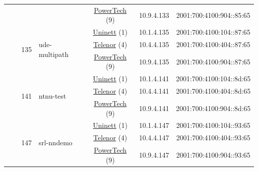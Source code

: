 \begin{small}
\begin{center}
\begin{longtable}{|c|c|c|c|c|c|c|c|}
  &  &  &  & \multicolumn{2}{|c|}{\tiny{\href{http://www.powertech.no}{PowerTech} (9)}} & \tiny{10.9.4.133} & \tiny{2001:700:4100:904::85:65} \\* \cline{3-3}\cline{4-4}\cline{5-5}\cline{6-6}\cline{7-7}\cline{8-8}
  &  & \multirow{3}{*}{\tiny{135}} & \multicolumn{1}{|l|}{\multirow{3}{*}{\tiny{ude-multipath}}} & \multicolumn{2}{|c|}{\tiny{\href{https://www.uninett.no}{Uninett} (1)}} & \tiny{10.1.4.135} & \tiny{2001:700:4100:104::87:65} \\* \cline{5-5}\cline{6-6}\cline{7-7}\cline{8-8}
  &  &  &  & \multicolumn{2}{|c|}{\tiny{\href{https://www.telenor.no}{Telenor} (4)}} & \tiny{10.4.4.135} & \tiny{2001:700:4100:404::87:65} \\* \cline{5-5}\cline{6-6}\cline{7-7}\cline{8-8}
  &  &  &  & \multicolumn{2}{|c|}{\tiny{\href{http://www.powertech.no}{PowerTech} (9)}} & \tiny{10.9.4.135} & \tiny{2001:700:4100:904::87:65} \\* \cline{3-3}\cline{4-4}\cline{5-5}\cline{6-6}\cline{7-7}\cline{8-8}
  &  & \multirow{3}{*}{\tiny{141}} & \multicolumn{1}{|l|}{\multirow{3}{*}{\tiny{ntnu-test}}} & \multicolumn{2}{|c|}{\tiny{\href{https://www.uninett.no}{Uninett} (1)}} & \tiny{10.1.4.141} & \tiny{2001:700:4100:104::8d:65} \\* \cline{5-5}\cline{6-6}\cline{7-7}\cline{8-8}
  &  &  &  & \multicolumn{2}{|c|}{\tiny{\href{https://www.telenor.no}{Telenor} (4)}} & \tiny{10.4.4.141} & \tiny{2001:700:4100:404::8d:65} \\* \cline{5-5}\cline{6-6}\cline{7-7}\cline{8-8}
  &  &  &  & \multicolumn{2}{|c|}{\tiny{\href{http://www.powertech.no}{PowerTech} (9)}} & \tiny{10.9.4.141} & \tiny{2001:700:4100:904::8d:65} \\* \cline{3-3}\cline{4-4}\cline{5-5}\cline{6-6}\cline{7-7}\cline{8-8}
  &  & \multirow{3}{*}{\tiny{147}} & \multicolumn{1}{|l|}{\multirow{3}{*}{\tiny{srl-nndemo}}} & \multicolumn{2}{|c|}{\tiny{\href{https://www.uninett.no}{Uninett} (1)}} & \tiny{10.1.4.147} & \tiny{2001:700:4100:104::93:65} \\* \cline{5-5}\cline{6-6}\cline{7-7}\cline{8-8}
  &  &  &  & \multicolumn{2}{|c|}{\tiny{\href{https://www.telenor.no}{Telenor} (4)}} & \tiny{10.4.4.147} & \tiny{2001:700:4100:404::93:65} \\* \cline{5-5}\cline{6-6}\cline{7-7}\cline{8-8}
  &  &  &  & \multicolumn{2}{|c|}{\tiny{\href{http://www.powertech.no}{PowerTech} (9)}} & \tiny{10.9.4.147} & \tiny{2001:700:4100:904::93:65} \\* \cline{3-3}\cline{4-4}\cline{5-5}\cline{6-6}\cline{7-7}\cline{8-8}

\end{longtable}
\end{center}
\end{small}
